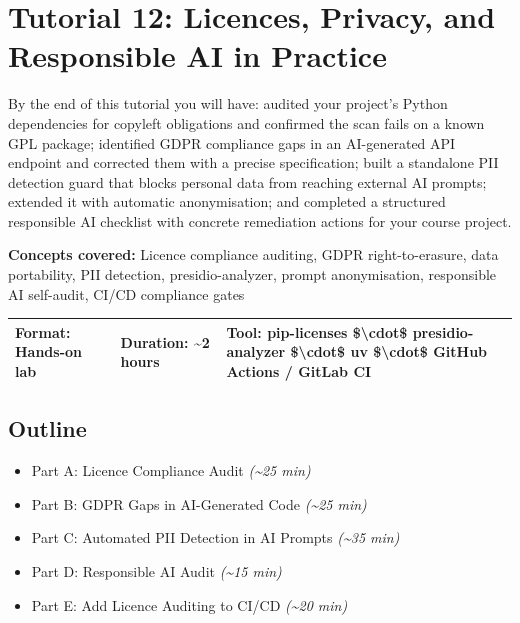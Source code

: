 \documentclass[11pt,a4paper]{book}
\begin{document}

\chapter{Tutorial 12: Licences, Privacy, and Responsible AI in Practice}

By the end of this tutorial you will have: audited your project's Python dependencies for copyleft obligations and confirmed the scan fails on a known GPL package; identified GDPR compliance gaps in an AI-generated API endpoint and corrected them with a precise specification; built a standalone PII detection guard that blocks personal data from reaching external AI prompts; extended it with automatic anonymisation; and completed a structured responsible AI checklist with concrete remediation actions for your course project.

\textbf{Concepts covered:} Licence compliance auditing, GDPR right-to-erasure, data portability, PII detection, presidio-analyzer, prompt anonymisation, responsible AI self-audit, CI/CD compliance gates

\begin{tabular}{lll}
\hline
\textbf{Format:} Hands-on lab & \textbf{Duration:} \textasciitilde{}2 hours & \textbf{Tool:} pip-licenses \$\textbackslash{}cdot\$ presidio-analyzer \$\textbackslash{}cdot\$ uv \$\textbackslash{}cdot\$ GitHub Actions / GitLab CI \\
\hline
\end{tabular}

\medskip

\section{Outline}

\begin{itemize}
  \item Part A: Licence Compliance Audit \textit{(\textasciitilde{}25 min)}
  \item Part B: GDPR Gaps in AI-Generated Code \textit{(\textasciitilde{}25 min)}
  \item Part C: Automated PII Detection in AI Prompts \textit{(\textasciitilde{}35 min)}
  \item Part D: Responsible AI Audit \textit{(\textasciitilde{}15 min)}
  \item Part E: Add Licence Auditing to CI/CD \textit{(\textasciitilde{}20 min)}
\end{itemize}
\end{document}
